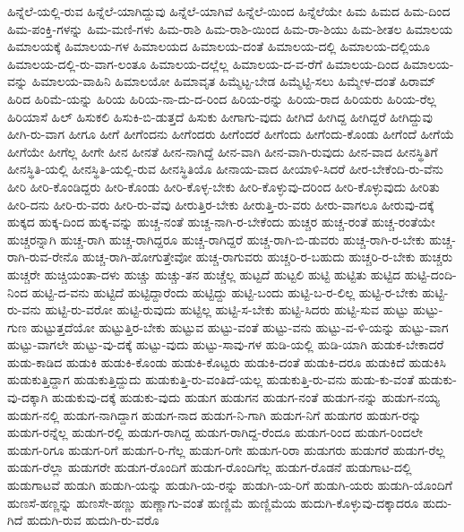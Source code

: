 {ಹಿನ್ನೆಲೆ-ಯಲ್ಲಿ-ರುವ
ಹಿನ್ನೆಲೆ-ಯಾಗಿದ್ದುವು
ಹಿನ್ನೆಲೆ-ಯಾಗಿವೆ
ಹಿನ್ನೆಲೆ-ಯಿಂದ
ಹಿನ್ನೆಲೆಯೇ
ಹಿಮ
ಹಿಮದ
ಹಿಮ-ದಿಂದ
ಹಿಮ-ಪಂಕ್ತಿ-ಗಳನ್ನು
ಹಿಮ-ಮಣಿ-ಗಳು
ಹಿಮ-ರಾಶಿ
ಹಿಮ-ರಾಶಿ-ಯಿಂದ
ಹಿಮ-ರಾ-ಶಿಯು
ಹಿಮ-ಶೀತಲ
ಹಿಮಾಲಯ
ಹಿಮಾಲಯಕ್ಕೆ
ಹಿಮಾಲಯ-ಗಳ
ಹಿಮಾಲಯದ
ಹಿಮಾಲಯ-ದಂತೆ
ಹಿಮಾಲಯ-ದಲ್ಲಿ
ಹಿಮಾಲಯ-ದಲ್ಲಿಯೂ
ಹಿಮಾಲಯ-ದಲ್ಲಿ-ರು-ವಾಗ-ಲಂತೂ
ಹಿಮಾಲಯ-ದಲ್ಲೆಲ್ಲ
ಹಿಮಾಲಯ-ದ-ವ-ರೆಗೆ
ಹಿಮಾಲಯ-ದಿಂದ
ಹಿಮಾಲಯ-ವನ್ನು
ಹಿಮಾಲಯ-ವಾಹಿನಿ
ಹಿಮಾಲಯೋ
ಹಿಮಾವೃತ
ಹಿಮ್ಮೆಟ್ಟ-ಬೇಡ
ಹಿಮ್ಮೆಟ್ಟಿ-ಸಲು
ಹಿಮ್ಮೇಳ-ದಂತೆ
ಹಿರಾಮ್
ಹಿರಿದ
ಹಿರಿಮೆ-ಯನ್ನು
ಹಿರಿಯ
ಹಿರಿಯ-ನಾ-ದು-ದ-ರಿಂದ
ಹಿರಿಯ-ರನ್ನು
ಹಿರಿಯ-ರಾದ
ಹಿರಿಯರು
ಹಿರಿಯ-ರೆಲ್ಲ
ಹಿರಿಯಾಸೆ
ಹಿಲ್
ಹಿಸುಕಲಿ
ಹಿಸುಕಿ-ಬಿ-ಡುತ್ತದೆ
ಹಿಸುಕು
ಹೀಗಾಗು-ವುದು
ಹೀಗಿದೆ
ಹೀಗಿದ್ದ
ಹೀಗಿದ್ದರೆ
ಹೀಗಿದ್ದುವು
ಹೀಗಿ-ರು-ವಾಗ
ಹೀಗೂ
ಹೀಗೆ
ಹೀಗೆಂದನು
ಹೀಗೆಂದರು
ಹೀಗೆಂದರೆ
ಹೀಗೆಂದು
ಹೀಗೆಂದು-ಕೊಂಡು
ಹೀಗೆಂದೆ
ಹೀಗೆಯೆ
ಹೀಗೆಯೇ
ಹೀಗೆಲ್ಲ
ಹೀಗೇ
ಹೀನ
ಹೀನತೆ
ಹೀನ-ನಾಗಿದ್ದೆ
ಹೀನ-ವಾಗಿ
ಹೀನ-ವಾಗಿ-ರುವುದು
ಹೀನ-ವಾದ
ಹೀನಸ್ಥಿತಿಗೆ
ಹೀನಸ್ಥಿತಿ-ಯಲ್ಲಿ
ಹೀನಸ್ಥಿತಿ-ಯಲ್ಲಿ-ರುವ
ಹೀನಸ್ಥಿತಿಯೊ
ಹೀನಾಯ-ವಾದ
ಹೀಯಾಳಿ-ಸಿದರೆ
ಹೀರ-ಬೇಕೆಂದಿ-ರು-ವೆನು
ಹೀರಿ
ಹೀರಿ-ಕೊಂಡಿದ್ದರು
ಹೀರಿ-ಕೊಂಡು
ಹೀರಿ-ಕೊಳ್ಳ-ಬೇಕು
ಹೀರಿ-ಕೊಳ್ಳುವು-ದರಿಂದ
ಹೀರಿ-ಕೊಳ್ಳುವುದು
ಹೀರಿತು
ಹೀರಿ-ದನು
ಹೀರಿ-ರು-ವರು
ಹೀರಿ-ರು-ವೆವು
ಹೀರುತ್ತಿರ-ಬೇಕು
ಹೀರುತ್ತಿ-ರು-ವರು
ಹೀರು-ವಾಗಲೂ
ಹೀರುವು-ದಕ್ಕೆ
ಹುಕ್ಕದ
ಹುಕ್ಕ-ದಿಂದ
ಹುಕ್ಕ-ವನ್ನು
ಹುಚ್ಚ-ನಂತೆ
ಹುಚ್ಚ-ನಾಗಿ-ರ-ಬೇಕೆಂದು
ಹುಚ್ಚರ
ಹುಚ್ಚ-ರಂತೆ
ಹುಚ್ಚ-ರಂತೆಯೇ
ಹುಚ್ಚರನ್ನಾಗಿ
ಹುಚ್ಚ-ರಾಗಿ
ಹುಚ್ಚ-ರಾಗಿದ್ದರೂ
ಹುಚ್ಚ-ರಾಗಿದ್ದರೆ
ಹುಚ್ಚ-ರಾಗಿ-ಬಿ-ಡುವರು
ಹುಚ್ಚ-ರಾಗಿ-ರ-ಬೇಕು
ಹುಚ್ಚ-ರಾಗಿ-ರುವ-ರೇನೊ
ಹುಚ್ಚ-ರಾಗಿ-ಹೋಗುತ್ತೇವೋ
ಹುಚ್ಚ-ರಾಗುವರು
ಹುಚ್ಚರಿ-ರ-ಬಹುದು
ಹುಚ್ಚರಿ-ರ-ಬೇಕು
ಹುಚ್ಚರು
ಹುಚ್ಚರೇ
ಹುಚ್ಚಿಯಂತಾ-ದಳು
ಹುಚ್ಚು
ಹುಚ್ಚು-ತನ
ಹುಚ್ಚೆಲ್ಲ
ಹುಟ್ಟದೆ
ಹುಟ್ಟಲಿ
ಹುಟ್ಟಿ
ಹುಟ್ಟಿತು
ಹುಟ್ಟಿದ
ಹುಟ್ಟಿ-ದಂದಿ-ನಿಂದ
ಹುಟ್ಟಿ-ದ-ವನು
ಹುಟ್ಟಿದೆ
ಹುಟ್ಟಿದ್ದಾರೆಂದು
ಹುಟ್ಟಿದ್ದು
ಹುಟ್ಟಿ-ಬಂದು
ಹುಟ್ಟಿ-ಬ-ರ-ಲಿಲ್ಲ
ಹುಟ್ಟಿ-ರ-ಬೇಕು
ಹುಟ್ಟಿ-ರು-ವನು
ಹುಟ್ಟಿ-ರು-ವರೋ
ಹುಟ್ಟಿ-ರುವುದು
ಹುಟ್ಟಿಲ್ಲ
ಹುಟ್ಟಿ-ಸ-ಬೇಕು
ಹುಟ್ಟಿ-ಸಿದರು
ಹುಟ್ಟಿ-ಸುವ
ಹುಟ್ಟು
ಹುಟ್ಟು-ಗುಣ
ಹುಟ್ಟುತ್ತದೆಯೋ
ಹುಟ್ಟುತ್ತಿರ-ಬೇಕು
ಹುಟ್ಟುವ
ಹುಟ್ಟು-ವಂತೆ
ಹುಟ್ಟು-ವನು
ಹುಟ್ಟು-ವ-ಳಿ-ಯನ್ನು
ಹುಟ್ಟು-ವಾಗ
ಹುಟ್ಟು-ವಾಗಲೇ
ಹುಟ್ಟು-ವು-ದಕ್ಕೆ
ಹುಟ್ಟು-ವುದು
ಹುಟ್ಟು-ಸಾವು-ಗಳ
ಹುಡಿ-ಯಲ್ಲಿ
ಹುಡಿ-ಯಾಗಿ
ಹುಡುಕ-ಬೇಕಾದರೆ
ಹುಡು-ಕಾಡಿದ
ಹುಡುಕಿ
ಹುಡುಕಿ-ಕೊಂಡು
ಹುಡುಕಿ-ಕೊಟ್ಟರು
ಹುಡುಕಿ-ದಂತೆ
ಹುಡುಕಿ-ದರೂ
ಹುಡುಕಿದೆ
ಹುಡುಕಿಸಿ
ಹುಡುಕುತ್ತಿದ್ದಾಗ
ಹುಡುಕುತ್ತಿದ್ದುದು
ಹುಡುಕುತ್ತಿ-ರು-ವಂತಿದೆ-ಯಲ್ಲ
ಹುಡುಕುತ್ತಿ-ರು-ವನು
ಹುಡು-ಕು-ವಂತೆ
ಹುಡುಕು-ವು-ದಕ್ಕಾಗಿ
ಹುಡುಕುವು-ದಕ್ಕೆ
ಹುಡುಕು-ವುದು
ಹುಡುಗ
ಹುಡುಗನ
ಹುಡುಗ-ನಂತೆ
ಹುಡುಗ-ನನ್ನು
ಹುಡುಗ-ನಯ್ಯ
ಹುಡುಗ-ನಲ್ಲಿ
ಹುಡುಗ-ನಾಗಿದ್ದಾಗ
ಹುಡುಗ-ನಾದ
ಹುಡುಗ-ನಿ-ಗಾಗಿ
ಹುಡುಗ-ನಿಗೆ
ಹುಡುಗರ
ಹುಡುಗ-ರನ್ನು
ಹುಡುಗ-ರನ್ನೆಲ್ಲ
ಹುಡುಗ-ರಲ್ಲಿ
ಹುಡುಗ-ರಾಗಿದ್ದ
ಹುಡುಗ-ರಾಗಿದ್ದ-ರೆಂದೂ
ಹುಡುಗ-ರಿಂದ
ಹುಡುಗ-ರಿಂದಲೇ
ಹುಡುಗ-ರಿಗೂ
ಹುಡುಗ-ರಿಗೆ
ಹುಡುಗ-ರಿ-ಗೆಲ್ಲ
ಹುಡುಗ-ರಿಗೇ
ಹುಡುಗ-ರಿರಾ
ಹುಡುಗರು
ಹುಡುಗರೆ
ಹುಡುಗ-ರೆಲ್ಲ
ಹುಡುಗ-ರೆಲ್ಲಾ
ಹುಡುಗರೇ
ಹುಡುಗ-ರೊಂದಿಗೆ
ಹುಡುಗ-ರೊಂದಿಗೆಲ್ಲ
ಹುಡುಗ-ರೊಡನೆ
ಹುಡುಗಾಟ-ದಲ್ಲಿ
ಹುಡುಗಾಟವೆ
ಹುಡುಗಿ
ಹುಡುಗಿ-ಯನ್ನು
ಹುಡುಗಿ-ಯ-ರನ್ನು
ಹುಡುಗಿ-ಯ-ರಿಗೆ
ಹುಡುಗಿ-ಯರು
ಹುಡುಗಿ-ಯೊಂದಿಗೆ
ಹುಣಸೆ-ಹಣ್ಣನ್ನು
ಹುಣಸೇ-ಹಣ್ಣು
ಹುಣ್ಣಾಗು-ವಂತೆ
ಹುಣ್ಣಿಮೆ
ಹುಣ್ಣಿಮೆಯ
ಹುದುಗಿ-ಕೊಳ್ಳುವು-ದಕ್ಕಾದರೂ
ಹುದು-ಗಿದೆ
ಹುದುಗಿ-ರುವ
ಹುದುಗಿ-ರು-ವರೊ
}
